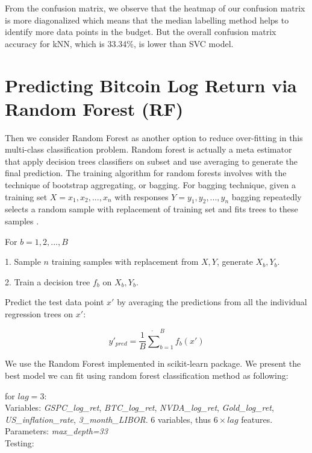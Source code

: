 \documentclass[9pt,twocolumn,twoside]{ilcss}
\begin{document}
From the confusion matrix, we observe that the heatmap of our confusion matrix is more diagonalized which means that the median labelling method helps to identify more data points in the budget. But the overall confusion matrix accuracy for kNN, which is 33.34\%, is lower than SVC model.

\section{Predicting Bitcoin Log Return via Random Forest (RF)}

Then we consider Random Forest as another option to reduce over-fitting in this multi-class classification problem. Random forest is actually a meta estimator that apply decision trees classifiers on subset and use averaging to generate the final prediction. The training algorithm for random forests involves with the technique of bootstrap aggregating, or bagging.
For bagging technique, given a training set $X = x_1,x_2,...,x_n$ with responses $Y = y_1,y_2,...,y_n$ bagging repeatedly selects a random sample with replacement of training set and fits trees to these samples \cite{lin2006random}.

\hspace{2mm} For $b=1,2,...,B$

\hspace{4mm}1. Sample $n$ training samples with replacement from $X,Y$, generate $X_b, Y_b$.

\hspace{4mm}2. Train a decision tree $f_b$ on $X_b, Y_b$.

\hspace{2mm} Predict the test data point $x'$ by averaging the predictions from all the individual regression trees on $x'$:

\[
y'_{pred}=\frac{1}{B} \dot \sum_{b=1}^B f_b(x')
\]

We use the Random Forest implemented in scikit-learn package. We present the best model we can fit using random forest classification method as following:

\noindent  for $lag = 3$:
\smallskip\\
Variables: \textit{GSPC\_log\_ret}, \textit{BTC\_log\_ret}, \textit{NVDA\_log\_ret}, \textit{Gold\_log\_ret}, \textit{US\_inflation\_rate}, \textit{3\_month\_LIBOR}. 6 variables, thus $6\times lag$ features.
Parameters: \textit{max\_depth=33}
\smallskip\\
Testing:
\end{document}

